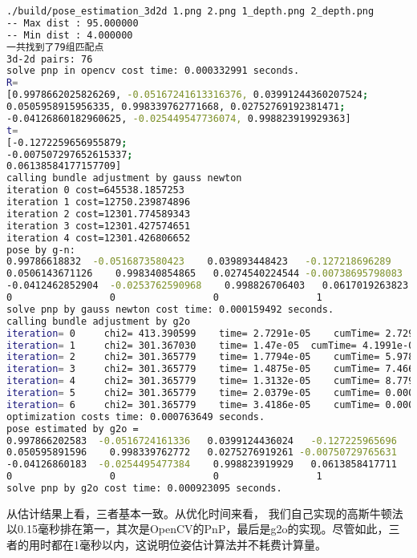 \begin{lstlisting}[language=sh,caption=终端输入：]
./build/pose_estimation_3d2d 1.png 2.png 1_depth.png 2_depth.png
-- Max dist : 95.000000 
-- Min dist : 4.000000 
一共找到了79组匹配点
3d-2d pairs: 76
solve pnp in opencv cost time: 0.000332991 seconds.
R=
[0.9978662025826269, -0.05167241613316376, 0.03991244360207524;
0.0505958915956335, 0.998339762771668, 0.02752769192381471;
-0.04126860182960625, -0.025449547736074, 0.998823919929363]
t=
[-0.1272259656955879;
-0.007507297652615337;
0.06138584177157709]
calling bundle adjustment by gauss newton
iteration 0 cost=645538.1857253
iteration 1 cost=12750.239874896
iteration 2 cost=12301.774589343
iteration 3 cost=12301.427574651
iteration 4 cost=12301.426806652
pose by g-n: 
0.99786618832  -0.0516873580423    0.039893448423   -0.127218696289
0.0506143671126    0.998340854865   0.0274540224544 -0.00738695798083
-0.0412462852904  -0.0253762590968    0.998826706403   0.0617019263823
0                 0                 0                 1
solve pnp by gauss newton cost time: 0.000159492 seconds.
calling bundle adjustment by g2o
iteration= 0	 chi2= 413.390599	 time= 2.7291e-05	 cumTime= 2.7291e-05	 edges= 76	 schur= 0	 lambda= 79.000412	 levenbergIter= 1
iteration= 1	 chi2= 301.367030	 time= 1.47e-05	 cumTime= 4.1991e-05	 edges= 76	 schur= 0	 lambda= 26.333471	 levenbergIter= 1
iteration= 2	 chi2= 301.365779	 time= 1.7794e-05	 cumTime= 5.9785e-05	 edges= 76	 schur= 0	 lambda= 17.555647	 levenbergIter= 1
iteration= 3	 chi2= 301.365779	 time= 1.4875e-05	 cumTime= 7.466e-05	 edges= 76	 schur= 0	 lambda= 11.703765	 levenbergIter= 1
iteration= 4	 chi2= 301.365779	 time= 1.3132e-05	 cumTime= 8.7792e-05	 edges= 76	 schur= 0	 lambda= 7.802510	 levenbergIter= 1
iteration= 5	 chi2= 301.365779	 time= 2.0379e-05	 cumTime= 0.000108171	 edges= 76	 schur= 0	 lambda= 41.613386	 levenbergIter= 3
iteration= 6	 chi2= 301.365779	 time= 3.4186e-05	 cumTime= 0.000142357	 edges= 76	 schur= 0	 lambda= 2859650082279.672363	 levenbergIter= 8
optimization costs time: 0.000763649 seconds.
pose estimated by g2o =
0.997866202583  -0.0516724161336   0.0399124436024   -0.127225965696
0.050595891596    0.998339762772   0.0275276919261 -0.00750729765631
-0.04126860183  -0.0254495477384    0.998823919929   0.0613858417711
0                 0                 0                 1
solve pnp by g2o cost time: 0.000923095 seconds.
\end{lstlisting}

从估计结果上看，三者基本一致。从优化时间来看， 我们自己实现的高斯牛顿法以0.15毫秒排在第一，其次是OpenCV的PnP，最后是g2o的实现。尽管如此，三者的用时都在1毫秒以内，这说明位姿估计算法并不耗费计算量。

